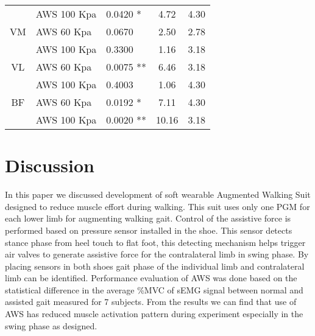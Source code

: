 \documentclass[letterpaper, 10 pt, conference]{ieeeconf}  %
\begin{document}
\begin{table}[]
\begin{tabular}{@{}cllcr@{}}
		& AWS 100 Kpa                             & 0.0420 *                                      & 4.72                      & 4.30                                             \\
		VM               & AWS 60 Kpa                              & 0.0670                                        & 2.50                      & 2.78                                             \\
		& AWS 100 Kpa                             & 0.3300                                        & 1.16                      & 3.18                                             \\
		VL               & AWS 60 Kpa                              & 0.0075 **                                     & 6.46                      & 3.18                                             \\
		& AWS 100 Kpa                             & 0.4003                                        & 1.06                      & 4.30                                             \\
		BF               & AWS 60 Kpa                              & 0.0192 *                                      & 7.11                      & 4.30                                             \\
		& AWS 100 Kpa                             & 0.0020 **                                     & 10.16                     & 3.18                                             \\ \bottomrule
	\end{tabular}
\end{table}

\section{Discussion} \label{discuss}

In this paper we discussed development of soft wearable Augmented Walking Suit designed to reduce muscle effort during walking. This suit uses only one PGM for each lower limb for augmenting walking gait. Control of the assistive force is performed based on pressure sensor installed in the shoe. This sensor detects stance phase from heel touch to flat foot, this detecting mechanism helps trigger air valves to generate assistive force for the contralateral limb in swing phase. By placing sensors in both shoes gait phase of the individual limb and contralateral limb can be identified. Performance evaluation of AWS was done based on the statistical difference in the average \%MVC of sEMG signal between normal and assisted gait measured for 7 subjects. From the results we can find that use of AWS has reduced muscle activation pattern during experiment especially in the swing phase as designed. 
\end{document}
